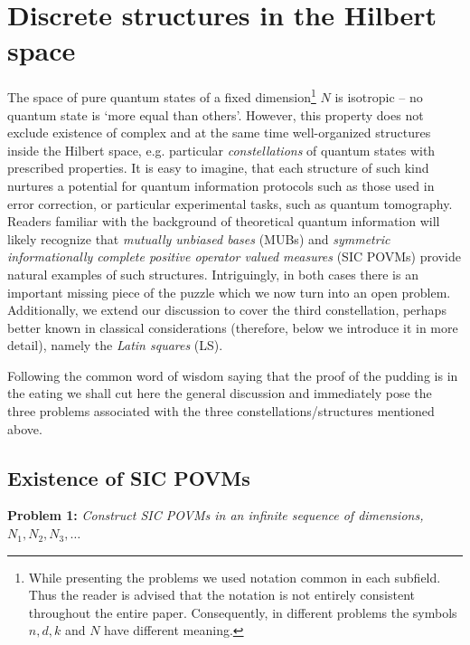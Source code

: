 \documentclass[english,aps,pra,nofootinbib,twocolumn,superscriptaddress]{revtex4-1}
\newcommand{\1}{{\rm 1\hspace{-0.9mm}l}}
\begin{document}
\section{Discrete structures in the Hilbert space}

The space of pure quantum states of a fixed dimension\footnote{
While presenting the problems we used notation common in each
subfield. Thus the reader is advised that the notation is not entirely
 consistent throughout the entire paper. Consequently,
in different problems the symbols $n, d, k$ and $N$ have different
meaning.} $N$
is isotropic -- no quantum
state is `more equal than others'. However, this property does not exclude existence of complex and at the same time well-organized structures inside the Hilbert space, e.g. particular {\sl constellations} of quantum states with prescribed properties. It is easy to imagine, that each structure of such kind nurtures a potential for quantum information protocols such as those used in error correction, or particular experimental tasks, such as quantum tomography. Readers familiar with the background of theoretical quantum information will likely recognize that {\sl mutually unbiased bases} (MUBs) and {\sl symmetric informationally complete positive operator valued measures} (SIC POVMs) provide natural examples of such structures. Intriguingly, in both cases there is an important missing piece of the puzzle which we now turn into an open problem. Additionally, we extend our discussion to cover the third constellation, perhaps better known in classical considerations (therefore, below we introduce it in more detail), namely the {\sl Latin squares} (LS). 

Following the common word of wisdom saying that the proof of the pudding is in the eating we shall cut here the general discussion and  immediately pose the three problems associated with the three constellations/structures mentioned above. 
  

\subsection{Existence of SIC POVMs}
{\bf Problem 1:} {\sl  Construct SIC POVMs in an infinite sequence of dimensions,
   $N_1, N_2, N_3, \dots$}

\bigskip
\end{document}
